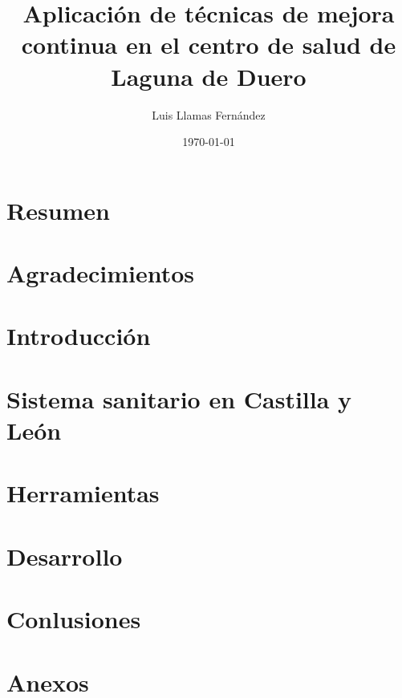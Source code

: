 \documentclass[12pt, a4paper]{report}
\begin{document}
\title{Aplicación de técnicas de mejora continua en el centro de salud de Laguna de Duero}
\author{Luis Llamas Fernández}
\date{\today}
\maketitle

\chapter*{Resumen}
\chapter*{Agradecimientos}

\tableofcontents

\chapter{Introducción}


\chapter{Sistema sanitario en Castilla y León}


\chapter{Herramientas}
\chapter{Desarrollo}
\chapter{Conlusiones}

\appendix
\chapter{Anexos}

\printbibliography
\end{document}
